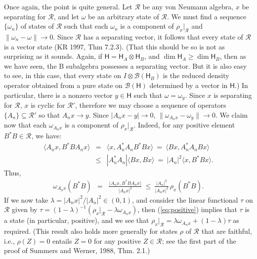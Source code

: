 \documentclass[12pt]{article}
\newcommand{\alg}[1]{\mbox{$\mathcal{#1}$}}
\newcommand{\hil}[1]{\mbox{$\mathsf{#1}$}}
\begin{document}
Once again, the point is quite general.  Let $\alg{R}$ be any von 
Neumann algebra, $x$ be separating for $\alg{R}$, and let $\omega$ be 
an arbitrary state of $\alg{R}$.  We must find a
sequence
$\{ \omega _{n} \}$ of states of $\alg{R}$ such that each $\omega _{n}$ is a
component of
$\rho_{x}|_{\alg{R}}$ and $\|\omega _{n}-\omega \|\rightarrow 0$.
Since $\alg{R}$ has a separating vector, it follows that every state of
$\alg{R}$ is a vector state (KR 1997, Thm 7.2.3).  (That this should 
be so is not 
as surprising as it sounds.  Again, if 
$\hil{H}=\hil{H}_{A}\otimes \hil{H}_{B}$, and $\dim\hil{H}_{A}\geq\dim 
\hil{H}_{B}$, then as we have seen, the B subalgebra possesses a 
separating vector.  But it is also easy to see, in this case, that every state on 
$I\otimes\alg{B}(\hil{H}_{B})$ is the reduced density operator 
obtained from a pure state on 
$\alg{B}(\hil{H})$ determined by a vector in $\hil{H}$.)   
In particular, there is a nonzero vector $y\in \hil{H}$
such that
$\omega =\omega _{y}$.  Since $x$ is separating for $\alg{R}$, $x$ is cyclic for
$\alg{R}'$, therefore we may choose a sequence of
operators $\{A_{n} \} \subseteq \alg{R}'$ so that $A_{n}x\rightarrow y$.  
Since $|A_{n}x-y|\rightarrow 0$, $\|\omega
    _{A_{n}x}-\omega _{y}\|\rightarrow 0$.  We claim now that each
  $\omega _{A_{n}x}$ is a component of $\rho_{x}|_{\alg{R}}$.  Indeed, for any
  positive element $B^{*}B\in\alg{R}$, we have:
  \begin{eqnarray}
    \langle A_{n}x,B^{*}BA_{n}x\rangle &=&\langle
    x,A_{n}^{*}A_{n}B^{*}Bx\rangle
    \:=\: \langle Bx,A_{n}^{*}A_{n}Bx\rangle \\
    &\leq &|A_{n}^{*}A_{n}|\langle Bx,Bx\rangle \: =\:
    |A_{n}|^{2}\langle x,B^{*}Bx\rangle . \end{eqnarray} Thus, 
    \begin{eqnarray} \label{eq:positive}
    \omega _{A_{n}x}(B^{*}B) &=& \frac{\langle
      A_{n}x,B^{*}BA_{n}x\rangle }{|A_{n}x|^{2}}\:\leq
    \:\frac{|A_{n}|^{2}}{|A_{n}x|^{2}}\,\rho _{x}(B^{*}B)
    .\end{eqnarray} If we now take $\lambda =
  |A_{n}x|^{2}/|A_{n}|^{2}\in (0,1)$, and consider 
  the linear functional  
  $\tau$ on $\alg{R}$ given by 
  $\tau=(1-\lambda)^{-1}(\rho_{x}|_{\alg{R}}-\lambda\omega_{A_{n}x})$, 
   then (\ref{eq:positive}) 
  implies that $\tau$ is a 
  state (in particular, positive), and we see that $\rho _{x}|_{\alg{R}}=\lambda\omega
  _{A_{n}x}+(1-\lambda)\tau$ as required. (This result also holds more 
  generally for 
  states $\rho$ of $\alg{R}$ that are faithful, i.e., 
  $\rho(Z)=0$ entails $Z=0$ for any positive $Z\in\alg{R}$;
  see the first part of the 
  proof of Summers and Werner, 1988, Thm. 
  2.1.)
  
\end{document}
